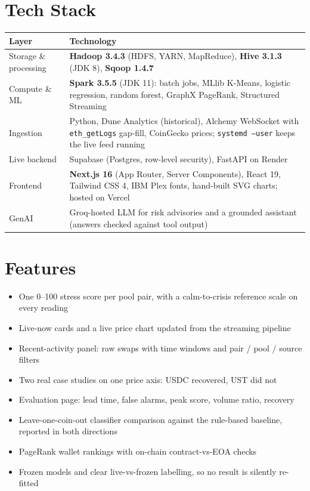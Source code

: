 \documentclass[11pt,a4paper]{article}
\let\oldsection\section
\renewcommand\section{\needspace{9\baselineskip}\oldsection}
\newcommand{\code}[1]{\texttt{\small #1}}
\begin{document}
\section*{Tech Stack}
\begin{tabularx}{\linewidth}{@{}>{\raggedright\arraybackslash}p{3.2cm}X@{}}
\toprule
\textbf{Layer} & \textbf{Technology}\\
\midrule
Storage \& processing & \textbf{Hadoop 3.4.3} (HDFS, YARN, MapReduce), \textbf{Hive 3.1.3} (JDK 8), \textbf{Sqoop 1.4.7}\\
Compute \& ML & \textbf{Spark 3.5.5} (JDK 11): batch jobs, MLlib K-Means, logistic regression, random forest, GraphX PageRank, Structured Streaming\\
Ingestion & Python, Dune Analytics (historical), Alchemy WebSocket with \code{eth\_getLogs} gap-fill, CoinGecko prices; \code{systemd --user} keeps the live feed running\\
Live backend & Supabase (Postgres, row-level security), FastAPI on Render\\
Frontend & \textbf{Next.js 16} (App Router, Server Components), React 19, Tailwind CSS 4, IBM Plex fonts, hand-built SVG charts; hosted on Vercel\\
GenAI & Groq-hosted LLM for risk advisories and a grounded assistant (answers checked against tool output)\\
\bottomrule
\end{tabularx}

\section*{Features}
\begin{itemize}
\item One 0--100 stress score per pool pair, with a calm-to-crisis reference scale on every reading
\item Live-now cards and a live price chart updated from the streaming pipeline
\item Recent-activity panel: raw swaps with time windows and pair / pool / source filters
\item Two real case studies on one price axis: USDC recovered, UST did not
\item Evaluation page: lead time, false alarms, peak score, volume ratio, recovery
\item Leave-one-coin-out classifier comparison against the rule-based baseline, reported in both directions
\item PageRank wallet rankings with on-chain contract-vs-EOA checks
\item Frozen models and clear live-vs-frozen labelling, so no result is silently re-fitted
\end{itemize}
\end{document}

